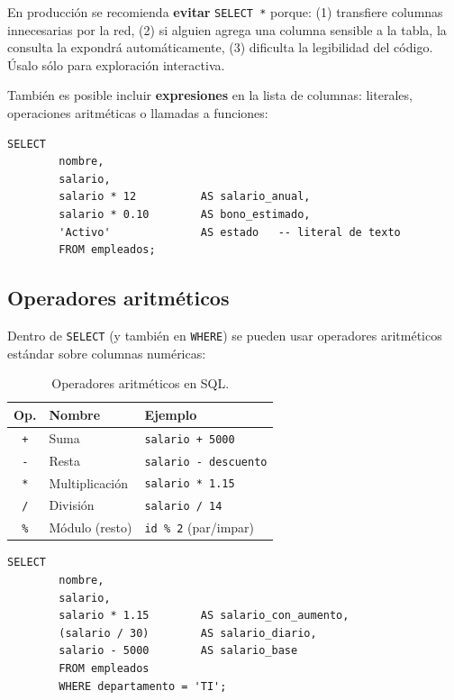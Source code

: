 \documentclass[12pt, a4paper]{article}
\begin{document}
	\begin{nota}
		En producción se recomienda \textbf{evitar} \texttt{SELECT *} porque:
		(1) transfiere columnas innecesarias por la red,
		(2) si alguien agrega una columna sensible a la tabla, la consulta
		la expondrá automáticamente,
		(3) dificulta la legibilidad del código.
		Úsalo sólo para exploración interactiva.
	\end{nota}
	
	También es posible incluir \textbf{expresiones} en la lista de
	columnas: literales, operaciones aritméticas o llamadas a funciones:
	
	\begin{lstlisting}[caption={Columnas calculadas y literales en SELECT.}]
		SELECT
		nombre,
		salario,
		salario * 12          AS salario_anual,
		salario * 0.10        AS bono_estimado,
		'Activo'              AS estado   -- literal de texto
		FROM empleados;
	\end{lstlisting}
	
	\subsection{Operadores aritméticos}
	
	Dentro de \texttt{SELECT} (y también en \texttt{WHERE}) se pueden
	usar operadores aritméticos estándar sobre columnas numéricas:
	
	\begin{table}[H]
		\centering
		\small
		\renewcommand{\arraystretch}{1.4}
		\begin{tabularx}{\linewidth}{@{} c l X @{}}
			\toprule
			\textbf{Op.} & \textbf{Nombre} & \textbf{Ejemplo} \\
			\midrule
			\texttt{+}  & Suma            & \texttt{salario + 5000} \\
			\texttt{-}  & Resta           & \texttt{salario - descuento} \\
			\texttt{*}  & Multiplicación  & \texttt{salario * 1.15} \\
			\texttt{/}  & División        & \texttt{salario / 14} \\
			\texttt{\%} & Módulo (resto)  & \texttt{id \% 2} (par/impar) \\
			\bottomrule
		\end{tabularx}
		\caption{Operadores aritméticos en SQL.}
		\label{tab:operadores-aritmeticos}
	\end{table}
	
	\begin{lstlisting}[caption={Uso de operadores aritméticos.}]
		SELECT
		nombre,
		salario,
		salario * 1.15        AS salario_con_aumento,
		(salario / 30)        AS salario_diario,
		salario - 5000        AS salario_base
		FROM empleados
		WHERE departamento = 'TI';
	\end{lstlisting}
	
\end{document}
